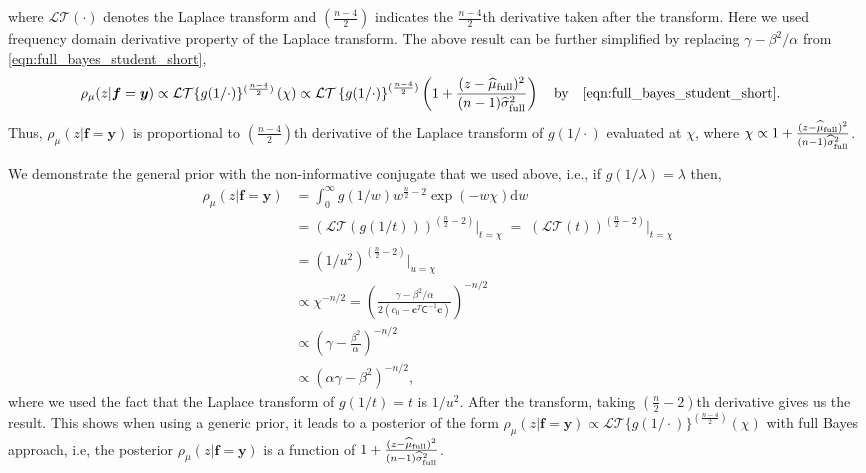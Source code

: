 \documentclass{iitthesis}          %
\newcommand{\bm}[1]{\boldsymbol{#1}}
\newcommand{\D}[1]{\text{d}{#1}}
\newcommand{\vc}{\bm{c}}
\newcommand{\vf}{\bm{f}}
\newcommand{\vy}{\bm{y}}
\newcommand{\mC}{\mathsf{C}}
\newcommand{\hmu}{\widehat{\mu}}
\begin{document}
where $\mathcal{LT}(\cdot)$ denotes the Laplace transform and $(\frac{n-4}2)$ indicates the $\frac{n-4}2$th derivative taken after the transform. Here we used frequency domain derivative property of the Laplace transform. 
The above result can be further simplified by replacing $\gamma - \beta^2/\alpha$ from  \eqref{eqn:full_bayes_student_short},
\begin{align*}
{\rho_{\mu}(z | \vf = \vy)} \propto \mathcal{LT} \{ g(1/\cdot) \}^{(\frac{n-4}2)} \left(\chi \right)
& \propto
\mathcal{LT} \left\{ g({1}/{\cdot})
 \right\}^{(\frac{n-4}2)} \left( 1 +  \frac{(z - \hmu_{\textup{full}})^2}{(n-1)\widehat{\sigma}_{\textup{full}}^2}\right) \quad \text{by} \quad \eqref{eqn:full_bayes_student_short}.
\end{align*}
Thus, $\rho_{\mu}(z | \vf = \vy)$  is proportional to $(\frac{n-4}{2})$th derivative of the Laplace transform of $g(1/\cdot)$ evaluated at $\chi$, where $\chi \propto { 1 +  \frac{(z - \hmu_{\textup{full}})^2}{(n-1)\widehat{\sigma}_{\textup{full}}^2} } $.

We demonstrate the general prior with the non-informative conjugate that we used above, i.e., if $\displaystyle g(1/\lambda) = {\lambda}$ then, 
\begin{align*}
{\rho_{\mu}(z | \vf = \vy)} 
&= \int_{0}^\infty g(1/w)  w^{\frac n2 -2}
\exp \left(  - w \chi \right)
\D w
\\
& = \displaystyle \left(\mathcal{LT}(g(1/t)) \right)^{(\frac n2 -2)} \lvert_{t=\chi}
\; = \; \displaystyle \left(\mathcal{LT}(t) \right)^{(\frac n2 -2)} \lvert_{t=\chi} 
\\
& = \left(1/u^{2} \right)^{(\frac n2 -2)} \lvert_{u=\chi}
\\
& \propto \chi^{-n/2} = \left( \frac{  \gamma - \beta^2/\alpha}{2(c_0  -\vc ^T \mC^{-1} \vc)} \right)^{-n/2}
\\
& \propto \left(\gamma - \frac{\beta^2}{\alpha}\right)^{-n/2}
\\
& \propto \left(\alpha \gamma - \beta^2\right)^{-n/2},
\end{align*}
where we used the fact that the Laplace transform of $g(1/t) = t$ is $1/u^2$. 
After the transform, taking $(\frac n2 -2)$th derivative gives us the result. This shows when using a generic prior, it leads to a posterior of the form
$ {\rho_{\mu}(z | \vf = \vy)}  \propto  \mathcal{LT} \{ g(1/\cdot) \}^{(\frac{n-4}2)} \left(\chi\right) $ with full Bayes approach, i.e, the posterior $\rho_{\mu}(z | \vf = \vy)$ is a function of ${ 1 +  \frac{(z - \hmu_{\textup{full}})^2}{(n-1)\widehat{\sigma}_{\textup{full}}^2} }$.
\end{document}
